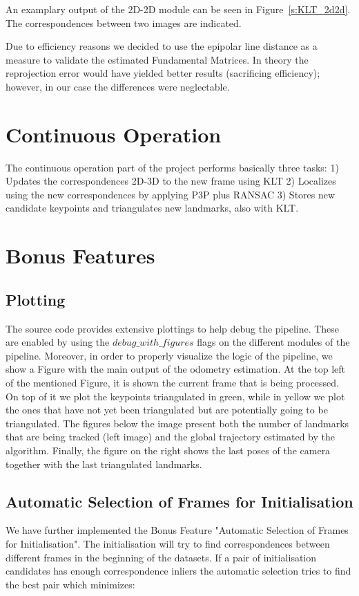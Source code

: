 An examplary output of the 2D-2D module can be seen in Figure~\ref{s:KLT_2d2d}. The correspondences between two images are indicated.

Due to efficiency reasons we decided to use the epipolar line distance as a measure to validate the estimated Fundamental Matrices. In theory the reprojection error would have yielded better results (sacrificing efficiency); however, in our case the differences were neglectable.

\section{Continuous Operation}
\label{s:ContOp}
The continuous operation part of the project performs basically three tasks:
1) Updates the correspondences 2D-3D to the new frame using KLT
2) Localizes using the new correspondences by applying P3P plus RANSAC
3) Stores new candidate keypoints and triangulates new landmarks, also with KLT.


\section{Bonus Features}
\label{s:BF}

\subsection{Plotting}
The source code provides extensive plottings to help debug the pipeline. These are enabled by using the $debug\_with\_figures$ flags
on the different modules of the pipeline. Moreover, in order to properly visualize the logic of the pipeline, we show a Figure 
with the main output of the odometry estimation.
At the top left of the mentioned Figure, it is shown the current frame that is being processed. On top of it we plot the keypoints
triangulated in green, while in yellow we plot the ones that have not yet been triangulated but are potentially going to be
triangulated.
The figures below the image present both the number of landmarks that are being tracked (left image) and the global trajectory
estimated by the algorithm.
Finally, the figure on the right shows the last poses of the camera together with the last triangulated landmarks.


\subsection{Automatic Selection of Frames for Initialisation}
We have further implemented the Bonus Feature "Automatic Selection of Frames for Initialisation". The initialisation will try to find correspondences between different frames in the beginning of the datasets. If a pair of initialisation candidates has enough correspondence inliers the automatic selection tries to find the best pair which minimizes:

